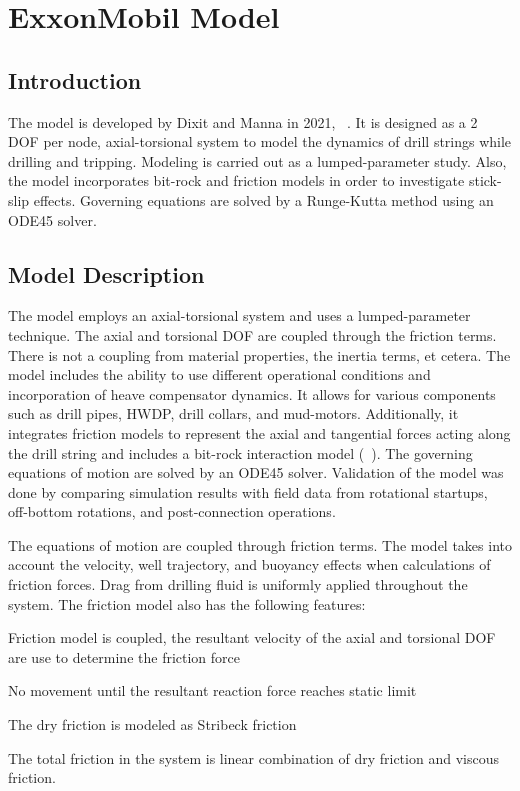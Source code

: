 \chapter{ExxonMobil Model}
\label{ch:exxonmobilmodel}

\section{Introduction}
The model is developed by Dixit and Manna in 2021, ~\cite{ref:dixit2021a}. It is designed as a 2 DOF per node, axial-torsional system to model the dynamics of drill strings while drilling and tripping. Modeling is carried out as a lumped-parameter study. Also, the model incorporates bit-rock and friction models in order to investigate stick-slip effects. Governing equations are solved by a Runge-Kutta method using an ODE45 solver. 

\section{Model Description}
The model employs an axial-torsional system and uses a lumped-parameter technique.  The axial and torsional DOF are coupled through the friction terms.  There is not a coupling from material properties, the inertia terms, et cetera.  The model includes the ability to use different operational conditions and incorporation of heave compensator dynamics.  It allows for various components such as drill pipes, HWDP, drill collars, and mud-motors. Additionally, it integrates friction models to represent the axial and tangential forces acting along the drill string and includes a bit-rock interaction model (~\cite{ref:dixit2021a}). The governing equations of motion are solved by an ODE45 solver. Validation of the model was done by comparing simulation results with field data from rotational startups, off-bottom rotations, and post-connection operations. 

The equations of motion are coupled through friction terms. The model takes into account the velocity, well trajectory, and buoyancy effects when calculations of friction forces. Drag from drilling fluid is uniformly applied throughout the system. The friction model also has the following features:
\begin{bulletedlist}
    \item Friction model is coupled, the resultant velocity of the axial and torsional DOF are use to determine the friction force
    \item No movement until the resultant reaction force reaches static limit
    \item The dry friction is modeled as Stribeck friction \resolvedcomment{}
    \item The total friction in the system is linear combination of dry friction and viscous friction.
\end{bulletedlist}


